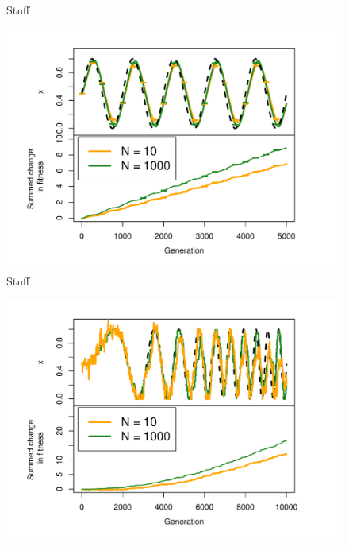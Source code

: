 \documentclass[10pt]{article}\usepackage[]{graphicx}\usepackage[]{color}
\makeatletter
\def\maxwidth{ %
  \ifdim\Gin@nat@width>\linewidth
    \linewidth
  \else
    \Gin@nat@width
  \fi
}
\theoremstyle{plain}
\makeatother
\begin{document}
\begin{multicols*}{2}
\begin{Schunk}
\begin{figure}[H]
{}

\caption[Stuff]{Stuff}\label{fig:fisherb}
\end{figure}
\end{Schunk}
\begin{Schunk}
\begin{figure}[H]

{\centering \includegraphics[width=\maxwidth]{figure/twocolumn-fisherc-1} 

}

\caption[Stuff]{Stuff}\label{fig:fisherc}
\end{figure}
\end{Schunk}

\begin{Schunk}
\begin{figure}[H]

{\centering \includegraphics[width=\maxwidth]{figure/twocolumn-fisherd-1} 

}
\end{figure}
\end{Schunk}
\end{multicols*}
\end{document}
